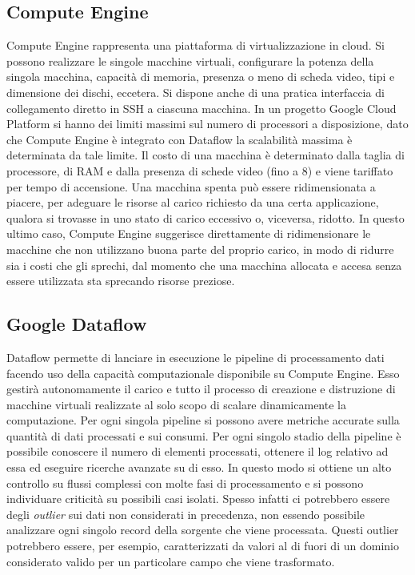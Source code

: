 \subsection{Compute Engine}\label{computengine}
Compute Engine rappresenta una piattaforma di virtualizzazione in cloud. Si possono realizzare le singole macchine virtuali, configurare la potenza della singola macchina, capacità di memoria, presenza o meno di scheda video, tipi e dimensione dei dischi, eccetera. Si dispone anche di una pratica interfaccia di collegamento diretto in SSH a ciascuna macchina. In un progetto Google Cloud Platform si hanno dei limiti massimi sul numero di processori a disposizione, dato che Compute Engine è integrato con Dataflow la scalabilità massima è determinata da tale limite. Il costo di una macchina è determinato dalla taglia di processore, di RAM e dalla presenza di schede video (fino a 8) e viene tariffato per tempo di accensione.
 Una macchina spenta può essere ridimensionata a piacere, per adeguare le risorse al carico richiesto da una certa applicazione, qualora si trovasse in uno stato di carico eccessivo o, viceversa, ridotto. In questo ultimo caso, Compute Engine suggerisce direttamente di ridimensionare le macchine che non utilizzano buona parte del proprio carico, in modo di ridurre sia i costi che gli sprechi, dal momento che una macchina allocata e accesa senza essere utilizzata sta sprecando risorse preziose.
\subsection{Google Dataflow}\label{dataflow}
Dataflow permette di lanciare in esecuzione le pipeline di processamento dati facendo uso della capacità computazionale disponibile su Compute Engine. Esso gestirà autonomamente il carico e tutto il processo di creazione e distruzione di macchine virtuali realizzate al solo scopo di scalare dinamicamente la computazione. Per ogni singola pipeline si possono avere metriche accurate sulla quantità di dati processati e sui consumi. Per ogni singolo stadio della pipeline è possibile conoscere il numero di elementi processati, ottenere il log relativo ad essa ed eseguire ricerche avanzate su di esso. In questo modo si ottiene un alto controllo su flussi complessi con molte fasi di processamento e si possono individuare criticità su possibili casi isolati. Spesso infatti ci potrebbero essere degli \textit{outlier} sui dati non considerati in precedenza, non essendo possibile analizzare ogni singolo record della sorgente che viene processata. Questi outlier potrebbero essere, per esempio, caratterizzati da valori al di fuori di un dominio considerato valido per un particolare campo che viene trasformato.
